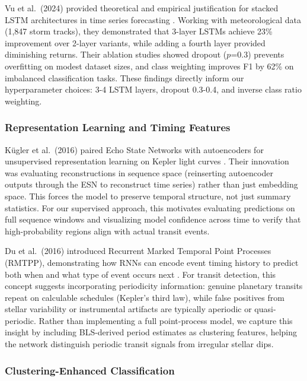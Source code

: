 Vu et al.\ (2024) provided theoretical and empirical justification for stacked LSTM architectures in time series forecasting \cite{Vu2024LSTM}. Working with meteorological data (1,847 storm tracks), they demonstrated that 3-layer LSTMs achieve 23\% improvement over 2-layer variants, while adding a fourth layer provided diminishing returns. Their ablation studies showed dropout ($p$=0.3) prevents overfitting on modest dataset sizes, and class weighting improves F1 by 62\% on imbalanced classification tasks. These findings directly inform our hyperparameter choices: 3-4 LSTM layers, dropout 0.3-0.4, and inverse class ratio weighting.

\subsubsection{Representation Learning and Timing Features}

K\"ugler et al.\ (2016) paired Echo State Networks with autoencoders for unsupervised representation learning on Kepler light curves \cite{kugler2016explorativeapproachkepler}. Their innovation was evaluating reconstructions in sequence space (reinserting autoencoder outputs through the ESN to reconstruct time series) rather than just embedding space. This forces the model to preserve temporal structure, not just summary statistics. For our supervised approach, this motivates evaluating predictions on full sequence windows and visualizing model confidence across time to verify that high-probability regions align with actual transit events.

Du et al.\ (2016) introduced Recurrent Marked Temporal Point Processes (RMTPP), demonstrating how RNNs can encode event timing history to predict both when and what type of event occurs next \cite{Du2016markedtemporalpoint}. For transit detection, this concept suggests incorporating periodicity information: genuine planetary transits repeat on calculable schedules (Kepler's third law), while false positives from stellar variability or instrumental artifacts are typically aperiodic or quasi-periodic. Rather than implementing a full point-process model, we capture this insight by including BLS-derived period estimates as clustering features, helping the network distinguish periodic transit signals from irregular stellar dips.

\subsubsection{Clustering-Enhanced Classification}

